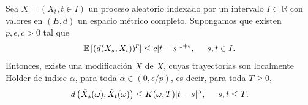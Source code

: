 \begin{theorem}
Sea $X = (X_t, t \in I)$ un proceso aleatorio indexado por un intervalo $I \subset \mathbb{R}$ con valores en $(E, d)$ un espacio métrico completo. Supongamos que existen $p, \epsilon, c > 0$ tal que
	\begin{align*}
	\mathbb{E} \left[\left( d(X_s, X_t)\right)^p\right] \leq c|t - s|^{1 + \epsilon}, \hspace{0.5cm} s, t \in I.
	\end{align*}
Entonces, existe una modificación $\tilde{X}$ de $X$, cuyas trayectorias son localmente Hölder de índice $\alpha$, para toda $\alpha \in (0, \epsilon / p)$, es decir, para toda $T \geq 0$,
	\begin{align*}
	d \left( \tilde{X}_s(\omega), \tilde{X}_t(\omega)\right) \leq K(\omega, T) |t - s|^{\alpha}, \hspace{0.5cm} s, t \leq T.
	\end{align*}
\end{theorem}
